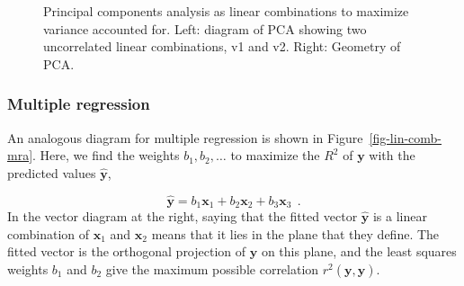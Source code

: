 \documentclass[
  letterpaper,
  10pt,
  krantz2]{krantz}
\begin{document}
\begin{figure}


\caption{\label{fig-lin-comb-pca}Principal components analysis as linear
combinations to maximize variance accounted for. Left: diagram of PCA
showing two uncorrelated linear combinations, v1 and v2. Right: Geometry
of PCA.}

\end{figure}%

\subsubsection*{Multiple regression}\label{multiple-regression}

An analogous diagram for multiple regression is shown in
Figure~\ref{fig-lin-comb-mra}. Here, we find the weights
\(b_1, b_2, \dots\) to maximize the \(R^2\) of \(\mathbf{y}\) with the
predicted values \(\widehat{\mathbf{y}}\),

\[
\widehat{\mathbf{y}} = b_1 \mathbf{x}_1 + b_2 \mathbf{x}_2 + b_3 \mathbf{x}_3 \:\: .
\] In the vector diagram at the right, saying that the fitted vector
\(\widehat{\mathbf{y}}\) is a linear combination of \(\mathbf{x}_1\) and
\(\mathbf{x}_2\) means that it lies in the plane that they define. The
fitted vector is the orthogonal projection of \(\mathbf{y}\) on this
plane, and the least squares weights \(b_1\) and \(b_2\) give the
maximum possible correlation \(r^2 (\mathbf{y}, \widehat{\mathbf{y}})\).
\end{document}
